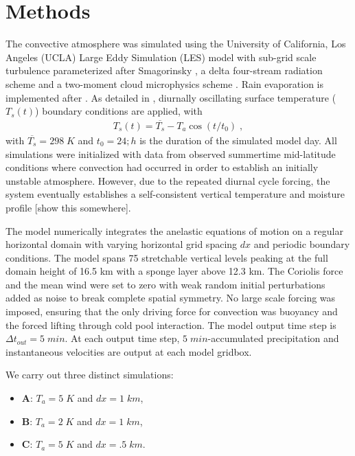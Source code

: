 \documentclass[draft]{agujournal2019}
\begin{document}
\section{Methods}\label{sec:methods}
The convective atmosphere was simulated using the University of California, Los Angeles (UCLA) Large Eddy Simulation (LES) model with sub-grid scale turbulence parameterized after Smagorinsky \cite{smagorinsky}, a delta four-stream radiation scheme \cite{pincus} and a two-moment cloud microphysics scheme \cite{stevens2005evaluation}. 
Rain evaporation is implemented after .
As detailed in , diurnally oscillating surface temperature ($T_s(t)$) boundary conditions are applied, with
\begin{eqnarray}
  T_s(t)=\overline{T_{s}}-T_{a} \cos{(t/t_0)}\;,
\end{eqnarray}
\noindent
with $\overline{T_{s}}=298\;K$ and $t_0=24;h$ is the duration of the simulated model day.
All simulations were initialized with data from observed summertime mid-latitude conditions where convection had occurred in order to establish an initially unstable atmosphere. 
However, due to the repeated diurnal cycle forcing, the system eventually establishes a self-consistent vertical temperature and moisture profile [show this somewhere].

\noindent
The model numerically integrates the anelastic equations of motion on a regular horizontal domain with varying horizontal grid spacing $dx$ and periodic boundary conditions. 
The model spans 75 stretchable vertical levels peaking at the full domain height of 16.5 km with a sponge layer above 12.3 km.
The Coriolis force and the mean wind were set to zero with weak random initial perturbations added as noise to break complete spatial symmetry. 
No large scale forcing was imposed,
ensuring that the only driving force for convection was buoyancy and the forced lifting through cold pool interaction.
The model output time step is $\Delta t_{out}=5\;min$. 
At each output time step, $5\;min$-accumulated precipitation and instantaneous velocities are output at each model gridbox. 

We carry out three distinct simulations:
\begin{itemize}
    \item {\bf A}: $T_a=5\;K$ and $dx=1\;km$,
    \item {\bf B}: $T_a=2\;K$ and $dx=1\;km$,
    \item {\bf C}: $T_a=5\;K$ and $dx=.5\;km$.
\end{itemize}
\end{document}
